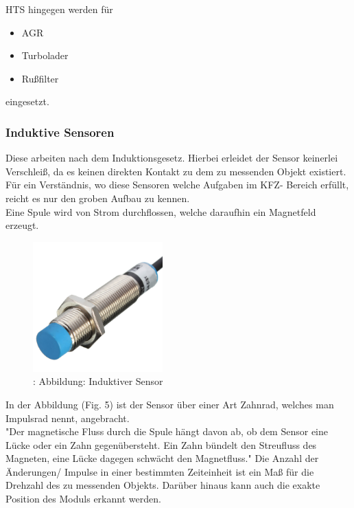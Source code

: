 			HTS hingegen werden für
			\begin{itemize}
				\item AGR
				\item Turbolader
				\item Rußfilter 
			\end{itemize}
			eingesetzt.
		
			\subsubsection{Induktive Sensoren}
		
			Diese arbeiten nach dem Induktionsgesetz. 
			Hierbei erleidet der Sensor keinerlei Verschleiß, da es keinen direkten Kontakt zu dem zu messenden Objekt existiert.\\
			Für ein Verständnis, wo diese Sensoren welche Aufgaben im KFZ- Bereich erfüllt, reicht es nur den groben Aufbau zu kennen.\\
			Eine Spule wird von Strom durchflossen, welche daraufhin ein Magnetfeld erzeugt.\\	


			\begin{figure}
				\centering
				\includegraphics[width=5cm, height=5cm] {induktiv.png}
				\caption{\cite{TS_ind_sensor}: Abbildung: Induktiver Sensor}
			\end{figure}

			In der Abbildung (Fig. 5) ist der Sensor über einer Art Zahnrad, welches man Impulsrad nennt, angebracht.\\
			"Der magnetische Fluss durch die Spule hängt davon ab, ob dem Sensor eine Lücke oder ein Zahn gegenübersteht. Ein Zahn bündelt den Streufluss des Magneten, eine Lücke dagegen schwächt den Magnetfluss." \cite{TS_ind_funkt}  
			Die Anzahl der Änderungen/ Impulse in einer bestimmten Zeiteinheit ist ein Maß für die Drehzahl des zu messenden Objekts. Darüber hinaus kann auch die exakte Position des Moduls erkannt werden.\\					
			
